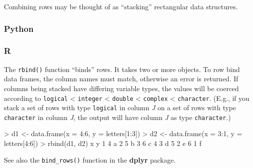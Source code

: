 \documentclass[
]{book}
\newenvironment{Shaded}{\begin{snugshade}}{\end{snugshade}}
\newcommand{\AttributeTok}[1]{\textcolor[rgb]{0.77,0.63,0.00}{#1}}
\newcommand{\DecValTok}[1]{\textcolor[rgb]{0.00,0.00,0.81}{#1}}
\newcommand{\FunctionTok}[1]{\textcolor[rgb]{0.00,0.00,0.00}{#1}}
\newcommand{\NormalTok}[1]{#1}
\newcommand{\OtherTok}[1]{\textcolor[rgb]{0.56,0.35,0.01}{#1}}
\newcommand{\SpecialCharTok}[1]{\textcolor[rgb]{0.00,0.00,0.00}{#1}}
\begin{document}
Combining rows may be thought of as ``stacking'' rectangular data structures.

\hypertarget{python-27}{%
\subsubsection*{Python}\label{python-27}}

\hypertarget{r-27}{%
\subsubsection*{R}\label{r-27}}

The \texttt{rbind()} function ``binds'' rows. It takes two or more objects. To row bind data frames, the column names must match, otherwise an error is returned. If columns being stacked have differing variable types, the values will be coerced according to \texttt{logical} \textless{} \texttt{integer} \textless{} \texttt{double} \textless{} \texttt{complex} \textless{} \texttt{character}. (E.g., if you stack a set of rows with type \texttt{logical} in column \emph{J} on a set of rows with type \texttt{character} in column \emph{J}, the output will have column \emph{J} as type \texttt{character}.)

\begin{Shaded}
\begin{Highlighting}[]
\SpecialCharTok{\textgreater{}}\NormalTok{ d1 }\OtherTok{\textless{}{-}} \FunctionTok{data.frame}\NormalTok{(}\AttributeTok{x =} \DecValTok{4}\SpecialCharTok{:}\DecValTok{6}\NormalTok{, }\AttributeTok{y =}\NormalTok{ letters[}\DecValTok{1}\SpecialCharTok{:}\DecValTok{3}\NormalTok{])}
\SpecialCharTok{\textgreater{}}\NormalTok{ d2 }\OtherTok{\textless{}{-}} \FunctionTok{data.frame}\NormalTok{(}\AttributeTok{x =} \DecValTok{3}\SpecialCharTok{:}\DecValTok{1}\NormalTok{, }\AttributeTok{y =}\NormalTok{ letters[}\DecValTok{4}\SpecialCharTok{:}\DecValTok{6}\NormalTok{])}
\SpecialCharTok{\textgreater{}} \FunctionTok{rbind}\NormalTok{(d1, d2)}
\NormalTok{  x y}
\DecValTok{1} \DecValTok{4}\NormalTok{ a}
\DecValTok{2} \DecValTok{5}\NormalTok{ b}
\DecValTok{3} \DecValTok{6}\NormalTok{ c}
\DecValTok{4} \DecValTok{3}\NormalTok{ d}
\DecValTok{5} \DecValTok{2}\NormalTok{ e}
\DecValTok{6} \DecValTok{1}\NormalTok{ f}
\end{Highlighting}
\end{Shaded}

See also the \texttt{bind\_rows()} function in the \textbf{dplyr} package.
\end{document}
